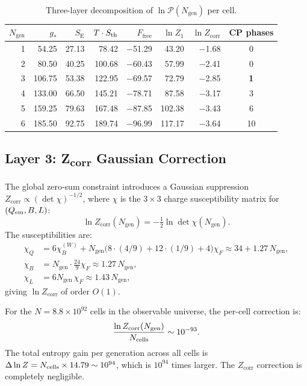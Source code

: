 \documentclass[12pt,a4paper]{article}
\theoremstyle{definition}
\newcommand{\gstar}{g_{*}}
\newcommand{\Ngen}{N_{\mathrm{gen}}}
\newcommand{\Zcorr}{Z_{\mathrm{corr}}}
\newcommand{\Sact}{S_{\mathrm{E}}}
\newcommand{\Ffree}{F_{\mathrm{free}}}
\begin{document}
\begin{table}[h]
\centering
\caption{Three-layer decomposition of $\ln\mathcal{P}(\Ngen)$ per cell.}
\label{tab:layers}
\begin{tabular}{rrrrrrrc}
\toprule
$\Ngen$ & $\gstar$ & $\Sact$ & $T\cdot S_{\rm th}$ & $\Ffree$ &
$\ln Z_1$ & $\ln\Zcorr$ & CP phases \\
\midrule
1 & 54.25 & 27.13 & 78.42 & $-$51.29 & 43.20 & $-$1.68 & 0 \\
2 & 80.50 & 40.25 & 100.68 & $-$60.43 & 57.99 & $-$2.41 & 0 \\
\rowcolor{lightgold}
3 & 106.75 & 53.38 & 122.95 & $-$69.57 & 72.79 & $-$2.85 & \textbf{1} \\
4 & 133.00 & 66.50 & 145.21 & $-$78.71 & 87.58 & $-$3.17 & 3 \\
5 & 159.25 & 79.63 & 167.48 & $-$87.85 & 102.38 & $-$3.43 & 6 \\
6 & 185.50 & 92.75 & 189.74 & $-$96.99 & 117.17 & $-$3.64 & 10 \\
\bottomrule
\end{tabular}
\end{table}

\subsection{Layer 3: Z\textsubscript{corr} Gaussian Correction}

The global zero-sum constraint introduces a Gaussian suppression
$\Zcorr \propto (\det\chi)^{-1/2}$, where $\chi$ is the $3\times3$
charge susceptibility matrix for $(Q_{\rm em}, B, L)$:
\begin{equation}
  \ln\Zcorr(\Ngen) = -\tfrac{1}{2}\ln\det\chi(\Ngen).
\end{equation}
The susceptibilities are:
\begin{align}
  \chi_Q &= 6\chi_B^{(W)} + \Ngen\bigl(8\cdot(4/9) + 12\cdot(1/9) + 4\bigr)\chi_F
  \approx 34 + 1.27\,\Ngen, \\
  \chi_B &= \Ngen\cdot\frac{24}{9}\chi_F \approx 1.27\,\Ngen, \\
  \chi_L &= 6\Ngen\,\chi_F \approx 1.43\,\Ngen,
\end{align}
giving $\ln\Zcorr$ of order $O(1)$.

For the $N = 8.8\times10^{92}$ cells in the observable universe, the
per-cell correction is:
\begin{equation}
  \frac{\ln\Zcorr(\Ngen)}{N_{\rm cells}} \sim 10^{-93}.
\end{equation}
The total entropy gain per generation across all cells is
$\Delta\ln Z = N_{\rm cells}\times 14.79 \sim 10^{94}$,
which is $10^{94}$ times larger. The $\Zcorr$ correction is
completely negligible.
\end{document}

